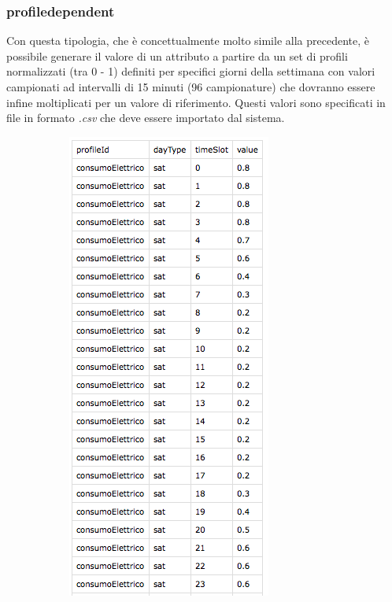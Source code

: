 \documentclass[12pt,a4paper,italian]{article}
\begin{document}
\subsubsection{profiledependent} \label{profiledependent}Con questa tipologia, che è concettualmente molto simile alla precedente, è possibile generare il valore di un attributo a partire da un set di profili normalizzati (tra 0 - 1) definiti per specifici giorni della settimana con
valori campionati ad intervalli di 15 minuti (96 campionature) che dovranno essere infine moltiplicati per un valore di riferimento. Questi valori sono specificati in file in formato \emph{.csv} che deve essere importato dal sistema.\\
\begin{figure}[!h]
	
	\begin{subfigure}{.3\textwidth}
		\centering
		\includegraphics[width=.8\linewidth]{img/profilo1.png}

\end{subfigure}
\end{figure}
\end{document}
